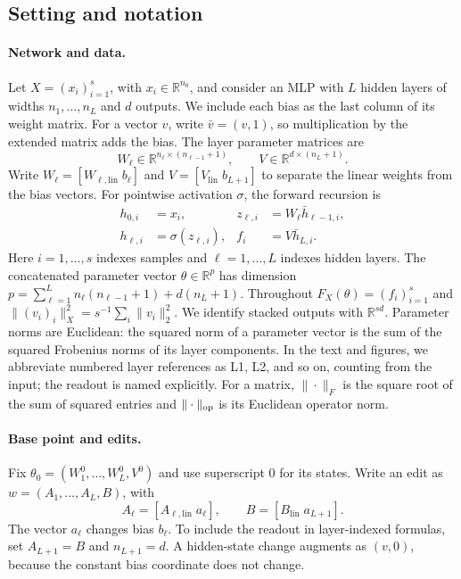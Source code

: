 \documentclass[twoside]{article}
\theoremstyle{remark}
\newcommand{\R}{\mathbb R}
\theoremstyle{highlightdefinition}
\theoremstyle{remark}
\begin{document}
\subsection{Setting and notation}
\label{app:setting}
\paragraph{Network and data.}
Let $X=(x_i)_{i=1}^s$, with $x_i\in\R^{n_0}$, and consider an MLP with $L$ hidden layers of widths $n_1,\ldots,n_L$ and $d$ outputs. We include each bias as the last column of its weight matrix. For a vector $v$, write $\bar v=(v,1)$, so multiplication by the extended matrix adds the bias. The layer parameter matrices are
\[
 W_\ell\in\R^{n_\ell\times(n_{\ell-1}+1)},\qquad
 V\in\R^{d\times(n_L+1)}.
\]
Write $W_\ell=[W_{\ell,\mathrm{lin}}\;b_\ell]$ and $V=[V_{\mathrm{lin}}\;b_{L+1}]$ to separate the linear weights from the bias vectors. For pointwise activation $\sigma$, the forward recursion is
\begin{align*}
 h_{0,i}&=x_i,& z_{\ell,i}&=W_\ell\bar h_{\ell-1,i},\\
 h_{\ell,i}&=\sigma(z_{\ell,i}),& f_i&=V\bar h_{L,i}.
\end{align*}
Here $i=1,\ldots,s$ indexes samples and $\ell=1,\ldots,L$ indexes hidden layers. The concatenated parameter vector $\theta\in\R^p$ has dimension
$p=\sum_{\ell=1}^L n_\ell(n_{\ell-1}+1)+d(n_L+1)$.
Throughout $F_X(\theta)=(f_i)_{i=1}^s$ and
$\|(v_i)_i\|_X^2=s^{-1}\sum_i\|v_i\|_2^2$.
We identify stacked outputs with $\R^{sd}$. Parameter norms are Euclidean: the squared norm of a parameter vector is the sum of the squared Frobenius norms of its layer components.
In the text and figures, we abbreviate numbered layer references as L1, L2, and so on, counting from the input; the readout is named explicitly. For a matrix, $\|\cdot\|_F$ is the square root of the sum of squared entries and $\|\cdot\|_{\rm op}$ is its Euclidean operator norm.

\paragraph{Base point and edits.}
Fix $\theta_0=(W_1^0,\ldots,W_L^0,V^0)$ and use superscript $0$ for its states. Write an edit as $w=(A_1,\ldots,A_L,B)$, with
\[
 A_\ell=[A_{\ell,\mathrm{lin}}\;a_\ell],\qquad
 B=[B_{\mathrm{lin}}\;a_{L+1}].
\]
The vector $a_\ell$ changes bias $b_\ell$. To include the readout in layer-indexed formulas, set $A_{L+1}=B$ and $n_{L+1}=d$. A hidden-state change augments as $(v,0)$, because the constant bias coordinate does not change.
\end{document}
